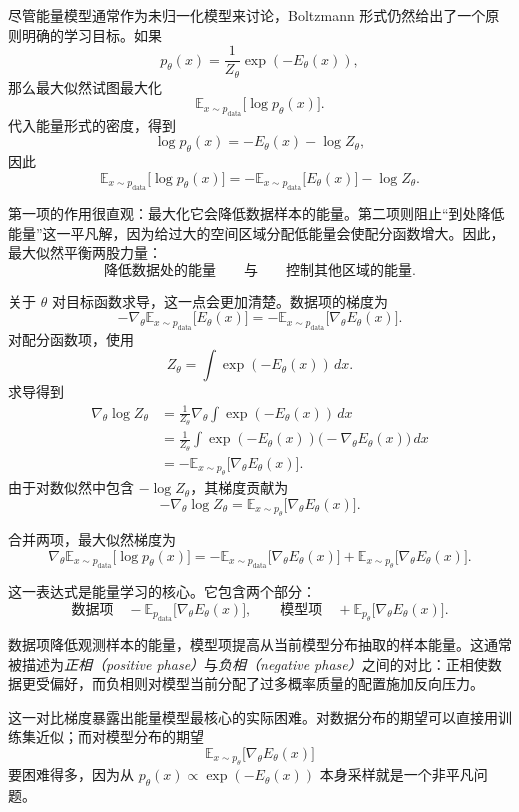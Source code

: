 尽管能量模型通常作为未归一化模型来讨论，Boltzmann 形式仍然给出了一个原则明确的学习目标。如果
\[
p_\theta(x)
=
\frac{1}{Z_\theta}\exp(-E_\theta(x)),
\]
那么最大似然试图最大化
\[
\mathbb{E}_{x\sim p_{\text{data}}}
\big[\log p_\theta(x)\big].
\]
代入能量形式的密度，得到
\[
\log p_\theta(x)
=
-E_\theta(x)-\log Z_\theta,
\]
因此
\[
\mathbb{E}_{x\sim p_{\text{data}}}
\big[\log p_\theta(x)\big]
=
-\mathbb{E}_{x\sim p_{\text{data}}}
\big[E_\theta(x)\big]
-
\log Z_\theta.
\]

第一项的作用很直观：最大化它会降低数据样本的能量。第二项则阻止“到处降低能量”这一平凡解，因为给过大的空间区域分配低能量会使配分函数增大。因此，最大似然平衡两股力量：
\[
\text{降低数据处的能量}
\qquad
\text{与}
\qquad
\text{控制其他区域的能量}.
\]

关于 $\theta$ 对目标函数求导，这一点会更加清楚。数据项的梯度为
\[
-\nabla_\theta
\mathbb{E}_{x\sim p_{\text{data}}}
\big[E_\theta(x)\big]
=
-
\mathbb{E}_{x\sim p_{\text{data}}}
\big[\nabla_\theta E_\theta(x)\big].
\]
对配分函数项，使用
\[
Z_\theta
=
\int
\exp(-E_\theta(x))\,dx.
\]
求导得到
\[
\begin{aligned}
\nabla_\theta \log Z_\theta
&=
\frac{1}{Z_\theta}
\nabla_\theta
\int
\exp(-E_\theta(x))\,dx \\[4pt]
&=
\frac{1}{Z_\theta}
\int
\exp(-E_\theta(x))
\big(-\nabla_\theta E_\theta(x)\big)\,dx \\[4pt]
&=
-
\mathbb{E}_{x\sim p_\theta}
\big[\nabla_\theta E_\theta(x)\big].
\end{aligned}
\]
由于对数似然中包含 $-\log Z_\theta$，其梯度贡献为
\[
-\nabla_\theta \log Z_\theta
=
\mathbb{E}_{x\sim p_\theta}
\big[\nabla_\theta E_\theta(x)\big].
\]

合并两项，最大似然梯度为
\[
\boxed{
\nabla_\theta
\mathbb{E}_{x\sim p_{\text{data}}}
\big[\log p_\theta(x)\big]
=
-
\mathbb{E}_{x\sim p_{\text{data}}}
\big[\nabla_\theta E_\theta(x)\big]
+
\mathbb{E}_{x\sim p_\theta}
\big[\nabla_\theta E_\theta(x)\big].
}
\]

这一表达式是能量学习的核心。它包含两个部分：
\[
\text{数据项}
\quad
-
\mathbb{E}_{p_{\text{data}}}
\big[\nabla_\theta E_\theta(x)\big],
\qquad
\text{模型项}
\quad
+
\mathbb{E}_{p_\theta}
\big[\nabla_\theta E_\theta(x)\big].
\]

数据项降低观测样本的能量，模型项提高从当前模型分布抽取的样本能量。这通常被描述为\emph{正相（positive phase）}与\emph{负相（negative phase）}之间的对比：正相使数据更受偏好，而负相则对模型当前分配了过多概率质量的配置施加反向压力。

这一对比梯度暴露出能量模型最核心的实际困难。对数据分布的期望可以直接用训练集近似；而对模型分布的期望
\[
\mathbb{E}_{x\sim p_\theta}
\big[\nabla_\theta E_\theta(x)\big]
\]
要困难得多，因为从 $p_\theta(x)\propto \exp(-E_\theta(x))$ 本身采样就是一个非平凡问题。

